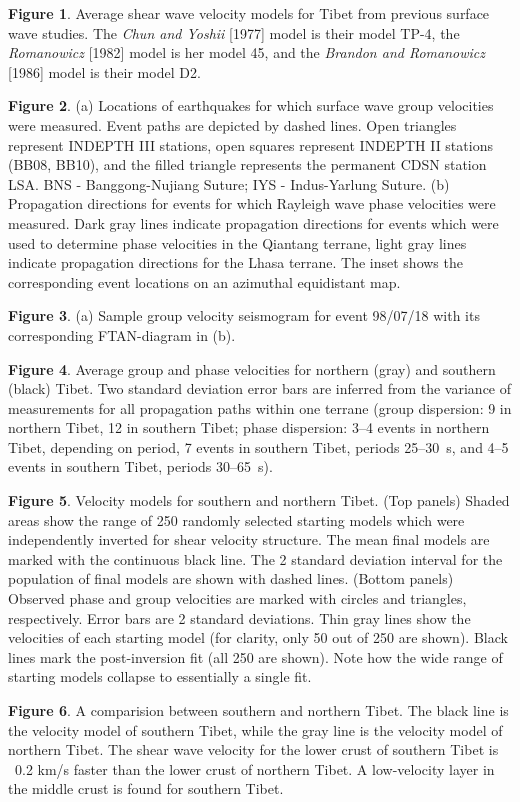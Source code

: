\documentclass[12pt]{article}
\begin{document}
\clearpage

\noindent
{\bf Figure 1}. Average shear wave velocity models for Tibet from previous
surface wave studies.  The {\it Chun and Yoshii} [1977] model is their model
TP-4, the {\it Romanowicz} [1982] model is her model 45, and the {\it Brandon
and Romanowicz} [1986] model is their model D2.

\noindent
{\bf Figure 2}. (a) Locations of earthquakes for which surface wave group
velocities were measured.  Event paths are depicted by dashed lines.
Open triangles represent INDEPTH III stations, open squares represent
INDEPTH II stations (BB08, BB10), and the filled triangle represents
the permanent CDSN station LSA.  BNS - Banggong-Nujiang Suture; IYS -
Indus-Yarlung Suture. (b) Propagation directions for events for which
Rayleigh wave phase velocities were measured. Dark gray lines indicate propagation directions for events which were used to determine phase velocities in the Qiantang terrane, light gray lines indicate propagation directions for the Lhasa terrane. The inset shows the corresponding event locations on an azimuthal equidistant map.

\noindent
{\bf Figure 3}. (a) Sample group velocity seismogram for event 98/07/18
with its corresponding FTAN-diagram in (b).

\noindent
{\bf Figure 4}. Average group and phase velocities for northern (gray) and southern (black) Tibet. Two standard deviation error
bars are inferred from the variance of measurements for all
propagation paths within one terrane (group dispersion: 9  in
northern Tibet, 12 in
southern Tibet; phase dispersion: 3--4 events in northern Tibet,
depending on period, 7 events in southern Tibet, periods 25--30~s, and
4--5 events in southern Tibet, periods 30--65~s).


\noindent
{\bf Figure 5}. Velocity models for southern and northern Tibet. (Top panels) Shaded areas show the range
of 250 randomly selected starting models which were independently inverted for shear velocity structure.
The mean final models are marked with the continuous black line. The 2 standard deviation interval for the population of final
models are shown with dashed lines. (Bottom panels) Observed phase and group velocities are marked with circles and triangles, respectively. Error bars are 2 standard deviations. Thin gray lines show the
velocities of each starting model (for clarity, only 50 out of 250 are shown). Black lines mark the
post-inversion fit (all 250 are shown). Note how the wide range of starting models collapse to essentially
a single fit.

\noindent
{\bf Figure 6}. A comparision between southern and northern Tibet. The black line
is the velocity model of southern Tibet, while the gray line is the velocity model of
northern Tibet. The shear wave velocity for the lower crust of southern Tibet is
~0.2 km/s faster than the lower crust of northern Tibet. A low-velocity layer in
the middle crust is found for southern Tibet.
\end{document}
